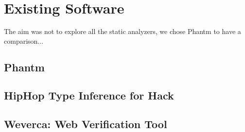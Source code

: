 \chapter{Existing Software}
    The aim was not to explore all the static analyzers, we chose Phantm to have a comparison...


    \section{Phantm\cite{kneuss2010using}}
    
    \section{HipHop Type Inference for Hack}
    
    \section{Weverca: Web Verification Tool\cite{hauzarhunting}}